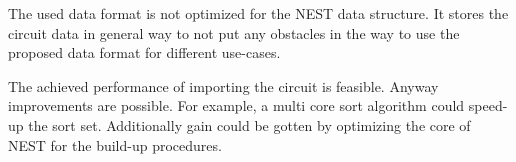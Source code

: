 The used data format is not optimized for the NEST data structure. It stores the circuit data in general way 
to not put any obstacles in the way to use the proposed data format for different use-cases.

The achieved performance of importing the circuit is feasible. Anyway improvements are possible.
For example, a multi core sort algorithm could speed-up the sort set.
Additionally gain could be gotten by optimizing the core of NEST for the build-up procedures.